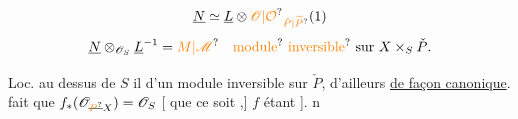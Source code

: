\[
\underline{N}\simeq\underline{L}\otimes\unsure{\mathscr{O}|\mathcal{O}}_{\unsure{\check{P}|\widetilde{P}}}(1)
\]
\[
\underline{N}\otimes_{\mathscr{O}_{S}}\underline{L}^{-1}=\unsure{M|\mathscr{M}}
\quad\text{\unsure{module} \unsure{inversible} sur }X\times_{S}\check{P}.
\]

Loc. au dessus de $S$ il  d'un module inversible sur $\check{P}$, d'ailleurs \uline{de façon canonique}.  fait que $f_{*}(\mathscr{O}_{\deleted{\unsure{P}}X})=\mathscr{O}_{S}$ [  que ce soit  ,] $f$ étant   ].
n

